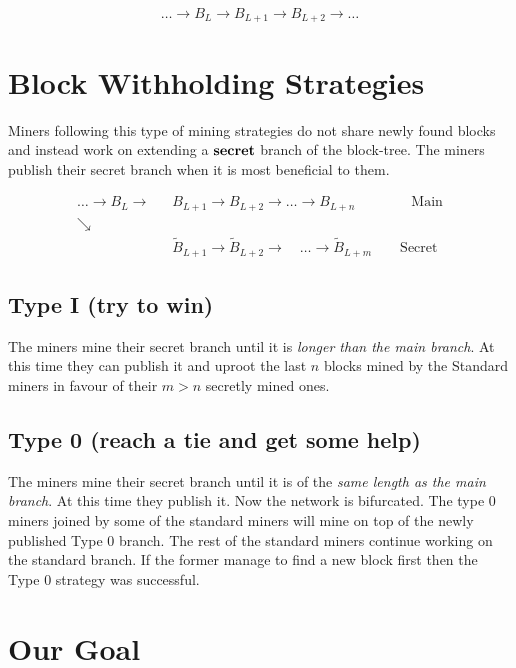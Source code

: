 \documentclass[letterpaper,12pt]{report}
\theoremstyle{plain}
\theoremstyle{definition}
\begin{document}
\begin{equation}\label{theblockchain}\nonumber
\dots\rightarrow\mathit{B}_L\rightarrow\mathit{B}_{L+1}\rightarrow\mathit{B}_{L+2}\rightarrow\dots
\end{equation}

\section{Block Withholding Strategies}
Miners following this type of mining strategies do not share newly found blocks and instead work on extending a $\bf{secret}$ branch of the block-tree. The miners publish their secret branch when it is most beneficial to them. 

\begin{eqnarray}\label{fig:blockwithholdingchain}
 \dots \rightarrow \mathit{B}_L\rightarrow &\mathit{B}_{L+1}\rightarrow\mathit{B}_{L+2}
\rightarrow\dots\rightarrow\mathit{B}_{L+n} \qquad\qquad \mathrm{Main}\\\nonumber
\searrow & \\\nonumber
\qquad \qquad \qquad & \widetilde{\mathit{B}}_{L+1}\rightarrow\widetilde{\mathit{B}}_{L+2}
\longrightarrow \quad \dots \longrightarrow\widetilde{\mathit{B}}_{L+m}\qquad \mathrm{Secret}
\end{eqnarray}

\subsection{Type I (try to win)}
The miners mine their secret branch until it is \textit{longer than the main branch}. At this time they can publish it and uproot the last $n$ blocks mined by the Standard miners in favour of their $m>n$ secretly mined ones.

\subsection{Type 0 (reach a tie and get some help)}
The miners mine their secret branch until it is of the  \textit{same length as the main branch}. At this time they publish it. Now the network is bifurcated. The type 0 miners joined by some of the standard miners will mine on top of the newly published Type 0 branch. The rest of the standard miners continue working on the standard branch. If the former manage to find a new block first then the Type 0 strategy was successful. 

\section{Our Goal}\label{subsec:goal}
\end{document}
